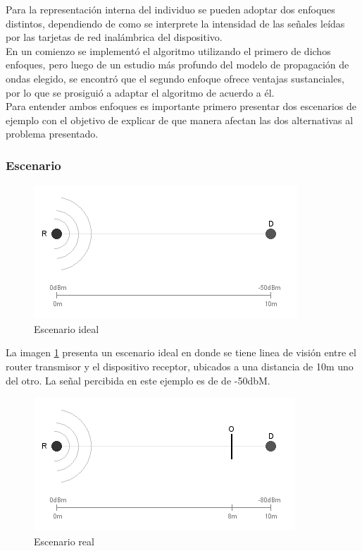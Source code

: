 \documentclass[journal]{IEEEtran}
\begin{document}
Para la representación interna del individuo se pueden adoptar dos enfoques distintos, dependiendo de como se interprete la intensidad de las señales leídas por las tarjetas de red inalámbrica del dispositivo.\\

En un comienzo se implementó el algoritmo utilizando el primero de dichos enfoques, pero luego de un estudio más profundo del modelo de propagación de ondas elegido, se encontró que el segundo enfoque ofrece ventajas sustanciales, por lo que se prosiguió a adaptar el algoritmo de acuerdo a él.\\

Para entender ambos enfoques es importante primero presentar dos escenarios de ejemplo con el objetivo de explicar de que manera afectan las dos alternativas al problema presentado.\\

\subsubsection{Escenario}

\begin{figure}[h]
\centering
\includegraphics[width=\linewidth]{ideal.png}
\caption{Escenario ideal}
\label{fig:ideal}
\end{figure}

La imagen \ref{fig:ideal} presenta un escenario ideal en donde se tiene linea de visión entre el router transmisor y el dispositivo receptor, ubicados a una distancia de 10m uno del otro. La señal percibida en este ejemplo es de de -50dbM.\\

\begin{figure}[h]
\centering
\includegraphics[width=\linewidth]{obstacle.png}
\caption{Escenario real}
\label{fig:obstacle}
\end{figure}
\end{document}
